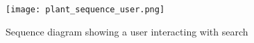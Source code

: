 \documentclass[oribibl]{llncs}
\begin{document}

\begin{figure}[p]
  \begin{center}
    \texttt{[image: plant\_sequence\_user.png]}
  \end{center}
  \caption{Sequence diagram showing a user interacting with search\label{sequence-user}}
\end{figure}
\end{document}
